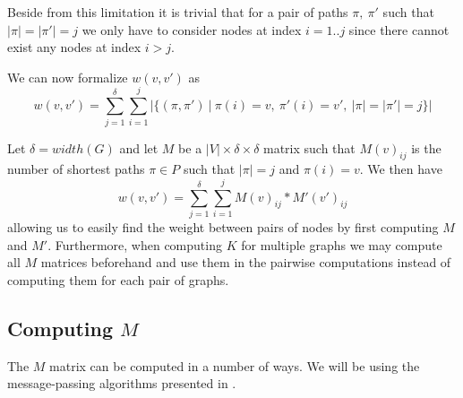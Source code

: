 \documentclass{article}
\renewenvironment{proof}[1][\proofname]{{\bfseries #1.}}{\qed}
\begin{document}

Beside from this limitation it is trivial that for a pair of paths $\pi,\ \pi'$ such that $|\pi|=|\pi'|=j$ we only have to consider nodes at index $i=1..j$ since there cannot exist any nodes at index $i>j$.


We can now formalize $w(v,v')$ as
\begin{equation}
w(v,v')=\sum_{j=1}^{\delta}\sum_{i=1}^{j}|\{(\pi, \pi')\ |\ \pi(i)=v,\ \pi'(i)=v',\ |\pi|=|\pi'|=j\}|
\end{equation}


Let $\delta=width(G)$ and let $M$ be a $|V|\times\delta\times\delta$ matrix such that $M(v)_{ij}$ is the number of shortest paths $\pi\in P$ such that $|\pi|=j$ and $\pi(i)=v$. We then have
\begin{equation}
w(v,v')=\sum_{j=1}^{\delta}\sum_{i=1}^{j}M(v)_{ij}*M'(v')_{ij}
\label{eq:wmm}
\end{equation}
allowing us to easily find the weight between pairs of nodes by first computing $M$ and $M'$. Furthermore, when computing $K$ for multiple graphs we may compute all $M$ matrices beforehand and use them in the pairwise computations instead of computing them for each pair of graphs.


\subsection{Computing $M$}
The $M$ matrix can be computed in a number of ways. We will be using the message-passing algorithms presented in \cite{graphhopper}.
\end{document}
